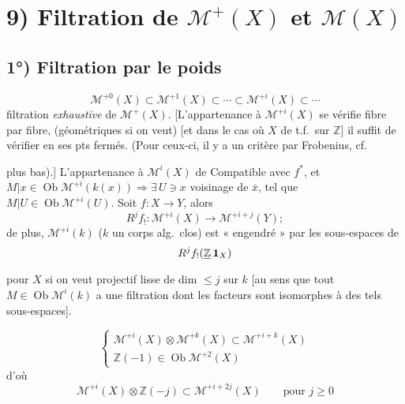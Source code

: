 \documentclass[11pt,a4paper]{article}
\begin{document}
\section{9) Filtration de $\mathcal{M}^{+}(X)$ et $\mathcal{M}(X)$}

\subsection{1°) Filtration par le poids}

\struck{\ill{}}
\[
  \mathcal{M}^{+0}(X) \subset \mathcal{M}^{+1}(X) \subset \cdots \subset \mathcal{M}^{+i}(X) \subset \cdots
\]
filtration \emph{exhaustive} de $\mathcal{M}^{+}(X)$. [L'appartenance à
$\mathcal{M}^{+i}(X)$ se vérifie fibre par fibre,
\struck{\ill{}} (géométriques si on veut) [et dans le cas où $X$ de t.f.\ sur $\mathbb{Z}$] il
suffit de vérifier en ses pts fermés. (Pour ceux-ci, il y a un critère par
Frobenius, cf.

plus bas).] 
 \ill{} L'appartenance à $\mathcal{M}^{i}(X)$ \ill{} de
 Compatible avec $f^{*}$, et
 $M|x \in \operatorname{Ob} \mathcal{M}^{+i}(k(x))
\Longrightarrow \exists\, U \ni x$ voisinage de $\bar{x}$, tel que
$M|U \in \operatorname{Ob} \mathcal{M}^{+i}(U)$. Soit $f : X \to Y$, alors
\[
  R^{j}f_{!} : \mathcal{M}^{+i}(X) \to \mathcal{M}^{+i+j}(Y) ;
\]
de plus, $\mathcal{M}^{+i}(k)$ ($k$ un corps alg.\ clos) est « engendré » par
les sous-espaces de
\[
  R^{j}f_{!}(\struck{\mathbb{Z}}\, \mathbf{1}_{X})
\]
pour $X$ si on veut projectif lisse de dim $\leqslant j$ sur $k$
[au sens que tout $M \in \operatorname{Ob} \mathcal{M}^{i}(k)$ a une
filtration dont les facteurs sont isomorphes à des tels sous-espaces].

\[
  \left\{
  \begin{array}{l}
    \mathcal{M}^{+i}(X) \otimes \mathcal{M}^{+k}(X) \subset \mathcal{M}^{+i+k}(X) \\
    \mathbb{Z}(-1) \in \operatorname{Ob} \mathcal{M}^{+2}(X)
  \end{array}
  \right.
\]
d'où
\[
  \mathcal{M}^{+i}(X) \otimes \mathbb{Z}(-j) \subset \mathcal{M}^{+i+2j}(X)
  \qquad \text{pour } j \geqslant 0
\]
\end{document}
